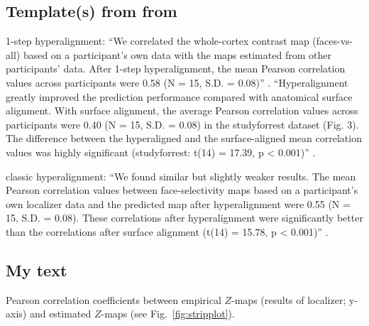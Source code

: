\subsection{Template(s) from from \citet{jiahui2020predicting}}

1-step hyperalignment: ``We correlated the whole-cortex contrast map
(faces-vs-all) based on a participant's own data with the maps estimated from
other participants' data.  After 1-step hyperalignment, the mean Pearson
correlation values across participants were 0.58 (N = 15, S.D. = 0.08)''
\citep{jiahui2020predicting}.
%
``Hyperalignment greatly improved the prediction performance compared with
anatomical surface alignment. With surface alignment, the average Pearson
correlation values across participants were 0.40 (N = 15, S.D. = 0.08) in the
studyforrest dataset (Fig. 3). The difference between the hyperaligned and the
surface-aligned mean correlation values was highly significant (studyforrest:
t(14) = 17.39, p < 0.001)'' \citep{jiahui2020predicting}.

%
classic hyperalignment: ``We found similar but slightly weaker results. The mean
Pearson correlation values between face-selectivity maps based on a
participant's own localizer data and the predicted map after hyperalignment were
0.55 (N = 15, S.D. = 0.08). These correlations after hyperalignment were
significantly better than the correlations after surface alignment (t(14) =
15.78, p < 0.001)'' \citep{jiahui2020predicting}.


\subsection{My text}




%
Pearson correlation coefficients between empirical $Z$-maps (results of
localizer; y-axis) and estimated $Z$-maps (see Fig.~\ref{fig:stripplot}).



